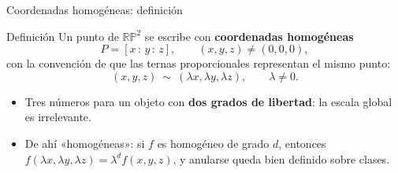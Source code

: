 \documentclass[aspectratio=169]{beamer}
\newcommand{\RP}{\mathbb{RP}}
\newcommand{\hp}[3]{[#1\,{:}\,#2\,{:}\,#3]}
\begin{document}
\begin{frame}{Coordenadas homogéneas: definición}
  \begin{block}{Definición}
    Un punto de $\RP^2$ se escribe con \textbf{coordenadas homogéneas}
    \[
      P = \hp{x}{y}{z}, \qquad (x,y,z)\neq(0,0,0),
    \]
    con la convención de que las ternas proporcionales representan el mismo
    punto:
    \[
      (x,y,z)\ \sim\ (\lambda x,\lambda y,\lambda z),
      \qquad \lambda\neq 0.
    \]
  \end{block}
  \begin{itemize}
    \item Tres números para un objeto con \textbf{dos grados de libertad}:
          la escala global es irrelevante.
    \item De ahí «homogéneas»: si $f$ es homogéneo de grado $d$, entonces
          $f(\lambda x,\lambda y,\lambda z)=\lambda^d f(x,y,z)$, y
          \alert{anularse} queda bien definido sobre clases.
  \end{itemize}
\end{frame}
\end{document}
